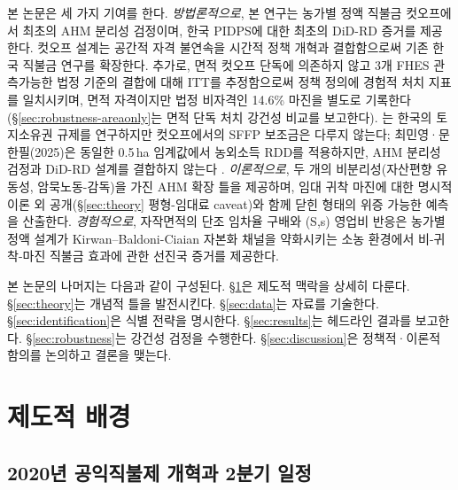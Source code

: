 \documentclass[12pt, a4paper]{article}
\begin{document}
본 논문은 세 가지 기여를 한다. \emph{방법론적으로}, 본 연구는 농가별 정액 직불금 컷오프에서 최초의 AHM 분리성 검정이며, 한국 PIDPS에 대한 최초의 DiD-RD 증거를 제공한다. 컷오프 설계는 공간적 자격 불연속을 시간적 정책 개혁과 결합함으로써 기존 한국 직불금 연구를 확장한다. 추가로, 면적 컷오프 단독에 의존하지 않고 3개 FHES 관측가능한 법정 기준의 결합에 대해 ITT를 추정함으로써 정책 정의에 경험적 처치 지표를 일치시키며, 면적 자격이지만 법정 비자격인 14.6\% 마진을 별도로 기록한다(\S\ref{sec:robustness-areaonly}는 면적 단독 처치 강건성 비교를 보고한다). \citet{ChoiJodlowski2025_landreg}는 한국의 토지소유권 규제를 연구하지만 컷오프에서의 SFFP 보조금은 다루지 않는다; 최민영·문한필(2025)은 동일한 0.5\,ha 임계값에서 농외소득 RDD를 적용하지만, AHM 분리성 검정과 DiD-RD 설계를 결합하지 않는다 \citep{ChoiMun2025_pidps_offinc}. \emph{이론적으로}, 두 개의 비분리성(자산편향 유동성, 암묵노동-감독)을 가진 AHM 확장 틀을 제공하며, 임대 귀착 마진에 대한 명시적 이론 외 공개(\S\ref{sec:theory} 평형-임대료 caveat)와 함께 닫힌 형태의 위증 가능한 예측을 산출한다. \emph{경험적으로}, 자작면적의 단조 임차율 구배와 (S,s) 영업비 반응은 농가별 정액 설계가 Kirwan--Baldoni-Ciaian 자본화 채널을 약화시키는 소농 환경에서 비-귀착-마진 직불금 효과에 관한 선진국 증거를 제공한다.

본 논문의 나머지는 다음과 같이 구성된다. \S\ref{sec:institutional}은 제도적 맥락을 상세히 다룬다. \S\ref{sec:theory}는 개념적 틀을 발전시킨다. \S\ref{sec:data}는 자료를 기술한다. \S\ref{sec:identification}은 식별 전략을 명시한다. \S\ref{sec:results}는 헤드라인 결과를 보고한다. \S\ref{sec:robustness}는 강건성 검정을 수행한다. \S\ref{sec:discussion}은 정책적·이론적 함의를 논의하고 결론을 맺는다.

\section{제도적 배경}
\label{sec:institutional}

\subsection{2020년 공익직불제 개혁과 2분기 일정}
\label{sec:institutional-reform}
\end{document}
